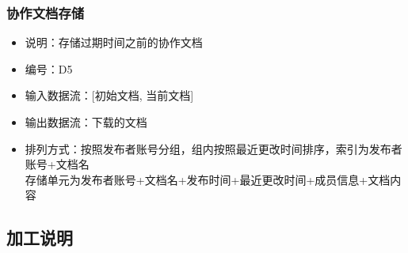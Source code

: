             \subsubsection{协作文档存储}
            \begin{itemize}
                \item 说明：存储过期时间之前的协作文档
                \item 编号：D5
                \item 输入数据流：[初始文档, 当前文档]
                \item 输出数据流：下载的文档
                \item 排列方式：按照发布者账号分组，组内按照最近更改时间排序，索引为发布者账号+文档名\\
                         存储单元为发布者账号+文档名+发布时间+最近更改时间+成员信息+文档内容\\
            \end{itemize}
        \subsection{加工说明}
